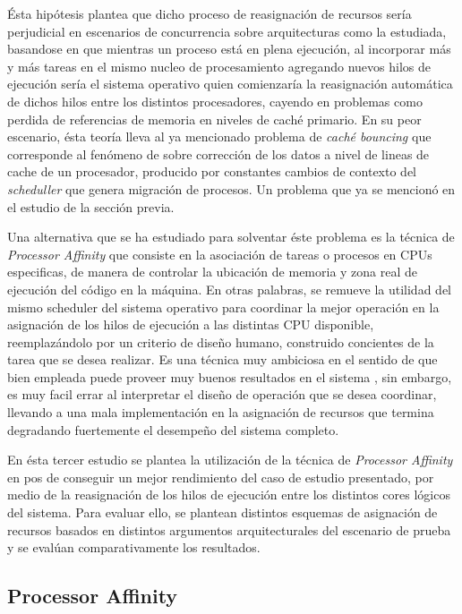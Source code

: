 Ésta hipótesis plantea que dicho proceso de reasignación de recursos sería perjudicial en escenarios de concurrencia sobre arquitecturas como la estudiada, basandose en que mientras un proceso está en plena ejecución, al incorporar más y más tareas en el mismo nucleo de procesamiento agregando nuevos hilos de ejecución sería el sistema operativo quien comienzaría la reasignación automática de dichos hilos entre los distintos procesadores, cayendo en problemas como perdida de referencias de memoria en niveles de caché primario. En su peor escenario, ésta teoría lleva al ya mencionado problema de \emph{caché bouncing} \cite{paper:cachebouncing} que corresponde al fenómeno de sobre corrección de los datos a nivel de lineas de cache de un procesador, producido por constantes cambios de contexto del \emph{scheduller} que genera migración de procesos. Un problema que ya se mencionó en el estudio de la sección previa.

Una alternativa que se ha estudiado para solventar éste problema es la técnica de \emph{Processor Affinity} que consiste en la asociación de tareas o procesos en CPUs especificas, de manera de controlar la ubicación de memoria y zona real de ejecución del código en la máquina. En otras palabras, se remueve la utilidad del mismo scheduler del sistema operativo para coordinar la mejor operación en la asignación de los hilos de ejecución a las distintas CPU disponible, reemplazándolo por un criterio de diseño humano, construido concientes de la tarea que se desea realizar. Es una técnica muy ambiciosa en el sentido de que bien empleada puede proveer muy buenos resultados en el sistema \cite{paper:cacheaffinity}, sin embargo, es muy facil errar al interpretar el diseño de operación que se desea coordinar, llevando a una mala implementación en la asignación de recursos que termina degradando fuertemente el desempeño del sistema completo.

En ésta tercer estudio se plantea la utilización de la técnica de \emph{Processor Affinity} en pos de conseguir un mejor rendimiento del caso de estudio presentado, por medio de la reasignación de los hilos de ejecución entre los distintos cores lógicos del sistema. Para evaluar ello, se plantean distintos esquemas de asignación de recursos basados en distintos argumentos arquitecturales del escenario de prueba y se evalúan comparativamente los resultados.

\subsection{Processor Affinity}
